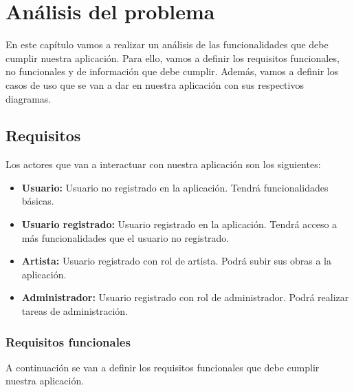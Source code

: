 \chapter{Análisis del problema}
En este capítulo vamos a realizar un análisis de las funcionalidades que debe cumplir
nuestra aplicación. Para ello, vamos a definir los requisitos funcionales,
no funcionales y de información que debe cumplir. Además, vamos a definir los
casos de uso que se van a dar en nuestra aplicación con sus respectivos diagramas.

\section{Requisitos}
Los actores que van a interactuar con nuestra aplicación son los siguientes:

\begin{itemize}
    \item \textbf{Usuario:} Usuario no registrado en la aplicación. Tendrá funcionalidades
    básicas.
    \item \textbf{Usuario registrado:} Usuario registrado en la aplicación. Tendrá
    acceso a más funcionalidades que el usuario no registrado.
    \item \textbf{Artista:} Usuario registrado con rol de artista. Podrá subir sus
    obras a la aplicación.
    \item \textbf{Administrador:} Usuario registrado con rol de administrador. Podrá
    realizar tareas de administración.
\end{itemize}

\subsection{Requisitos funcionales}
A continuación se van a definir los requisitos funcionales que debe cumplir nuestra
aplicación.


